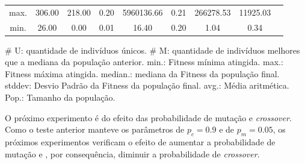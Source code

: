 \documentclass[a4paper]{article}
\begin{document}
\begin{table}[h!]
\begin{tabular}{| c | c | c | c | c | c | c | c | c |}
    max. & 306.00 & 218.00 & 0.20 & 5960136.66 & 0.21 & 266278.53 & 11925.03 & \\ \cline{1-8}
    min. & 26.00 & 0.00 & 0.01 & 16.40 & 0.20 & 1.04 & 0.34 & \\ \hline
  \end{tabular}
  \begin{minipage}{0.9\textwidth}
    {\center \footnotesize
      \# U: quantidade de indivíduos únicos. \# M: quantidade de indivíduos melhores
      que a mediana da população anterior. min.: Fitness mínima atingida. max.:
      Fitness máxima atingida. median.: mediana da Fitness da população final.
      stddev: Desvio Padrão da Fitness da população final. avg.: Média aritmética.
      Pop.: Tamanho da população.
    }
  \end{minipage}
\end{table}

O próximo experimento é do efeito das probabilidade de mutação e
\textit{crossover}.  Como o teste anterior manteve os parâmetros de $p_c=0.9$ e
de $p_m=0.05$, os próximos experimentos verificam o efeito de aumentar a
probabilidade de mutação e , por consequência, diminuir a probabilidade de
\textit{crossover}.
\end{document}
